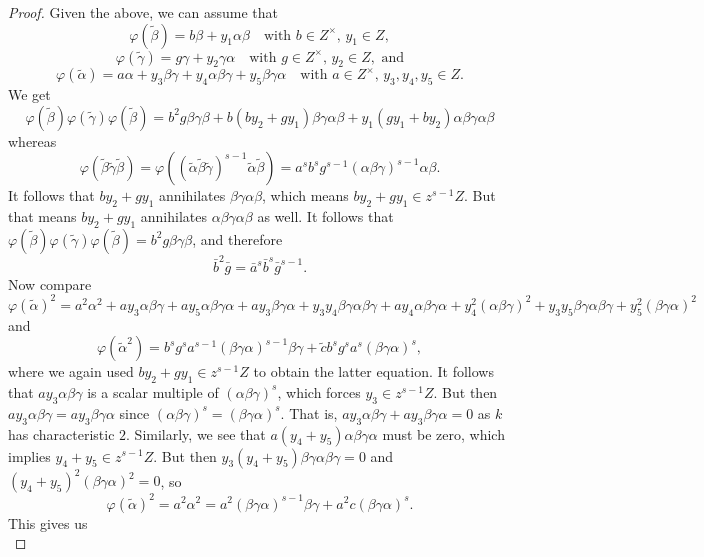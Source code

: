 \documentclass[10pt,a4paper]{amsart}
\begin{document}
\begin{proof}
  Given the above, we can assume that
  $$
    \varphi(\tilde \beta)=b\beta + y_1 \alpha\beta \quad\textrm{with $b\in Z^\times$, $y_1\in Z$},
  $$
  $$
    \varphi(\tilde \gamma)=g\gamma + y_2 \gamma\alpha \quad\textrm{with $g\in Z^\times$, $y_2\in Z$},\textrm{ and}
  $$
  $$
    \varphi(\tilde \alpha)=a\alpha + y_3 \beta\gamma+y_4 \alpha\beta\gamma + y_5 \beta\gamma\alpha \quad\textrm{with $a\in Z^\times$, $y_3,y_4,y_5\in Z$}.
  $$
  We get 
  $$
    \varphi(\tilde\beta)\varphi(\tilde\gamma)\varphi(\tilde\beta) = b^2g \beta\gamma\beta + b(by_2+gy_1)\beta\gamma\alpha\beta+y_1(gy_1+by_2)\alpha\beta\gamma\alpha\beta
  $$
  whereas 
  $$
    \varphi(\tilde\beta\tilde\gamma\tilde\beta)= \varphi((\tilde \alpha\tilde\beta\tilde\gamma)^{s-1}\tilde\alpha\tilde\beta)= a^sb^sg^{s-1} (\alpha\beta\gamma)^{s-1}\alpha\beta.
  $$
  It follows that $by_2+gy_1$ annihilates $\beta\gamma\alpha\beta$, which means $by_2+gy_1\in z^{s-1}Z$. But that means $by_2+gy_1$ annihilates $\alpha\beta\gamma\alpha\beta$ as well. It follows that $\varphi(\tilde\beta)\varphi(\tilde\gamma)\varphi(\tilde\beta) = b^2g \beta\gamma\beta$, and therefore 
  \begin{equation} \label{eqn:rels for hom 1}
    \bar b^2 \bar g= \bar a^s \bar b^s \bar g^{s-1}.
  \end{equation} 
  Now compare
  $$
    \varphi(\tilde\alpha)^2 = a^2\alpha^2 + ay_3 \alpha\beta\gamma + ay_5\alpha\beta\gamma\alpha +ay_3\beta\gamma\alpha + y_3y_4 \beta\gamma\alpha\beta\gamma + ay_4 \alpha\beta\gamma\alpha + y_4^2 (\alpha\beta\gamma)^2 + y_3y_5 \beta\gamma\alpha\beta\gamma + y_5^2 (\beta\gamma\alpha)^2 $$
  and 
  $$ \varphi(\tilde \alpha^2)= b^sg^sa^{s-1}(\beta\gamma\alpha)^{s-1}\beta\gamma+\tilde c b^sg^sa^s(\beta\gamma\alpha)^{s},$$
  where we again used $by_2+gy_1\in z^{s-1}Z$ to obtain the latter equation. It follows that $ay_3 \alpha\beta\gamma$ is a scalar multiple of $(\alpha\beta\gamma)^s$, which forces $y_3\in z^{s-1}Z$. But then $ay_3 \alpha\beta\gamma = ay_3\beta\gamma\alpha$ since $(\alpha\beta\gamma)^s=(\beta\gamma\alpha)^s$. That is, $ay_3 \alpha\beta\gamma + ay_3\beta\gamma\alpha =0$ as $k$ has characteristic $2$. Similarly, we see that $a(y_4+y_5)\alpha\beta\gamma\alpha$ must be zero, which implies $y_4+y_5\in z^{s-1}Z$. But then $y_3(y_4+y_5)\beta\gamma\alpha\beta\gamma=0$ and $(y_4+y_5)^2(\beta\gamma\alpha)^2=0$, so 
  $$\varphi(\tilde\alpha)^2 = a^2\alpha^2 = a^2(\beta\gamma\alpha)^{s-1}\beta\gamma+a^2c(\beta\gamma\alpha)^{s}.$$ 
  This gives us 
  \begin{equation} \label{eqn:rels for hom 2}

\end{equation}
\end{proof}
\end{document}
